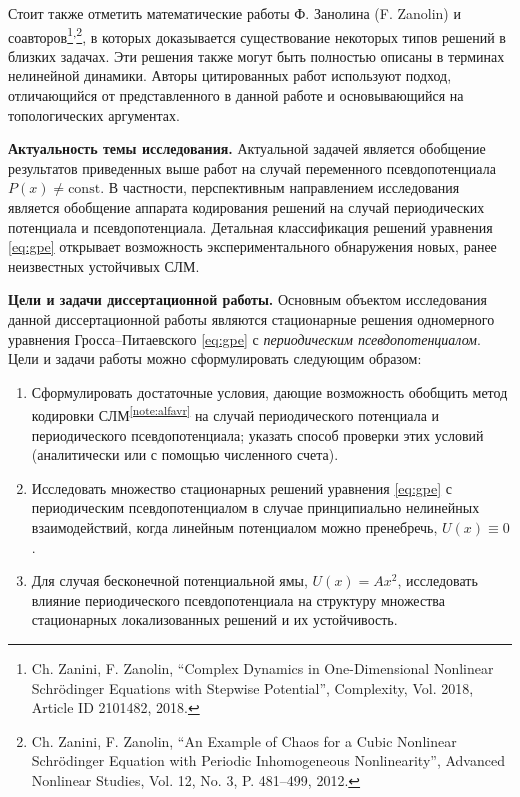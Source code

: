 \documentclass[candidate, href, colorlinks]{disser}
\begin{document}
Стоит также отметить математические работы Ф. Занолина (F. Zanolin) и соавторов\footnote{Ch. Zanini, F. Zanolin, ``Complex Dynamics in One-Dimensional Nonlinear Schr\"odinger Equations with Stepwise Potential'', Complexity, Vol. 2018, Article ID 2101482, 2018.}\textsuperscript{,}\footnote{Ch. Zanini, F. Zanolin, ``An Example of Chaos for a Cubic Nonlinear Schr\"odinger Equation with Periodic Inhomogeneous Nonlinearity'', Advanced Nonlinear Studies, Vol. 12, No. 3, P. 481--499, 2012.}, в которых доказывается существование некоторых типов решений в близких задачах.
Эти решения также могут быть полностью описаны в терминах нелинейной динамики.
Авторы цитированных работ используют подход, отличающийся от представленного в данной работе и основывающийся на топологических аргументах.

\textbf{Актуальность темы исследования.}
Актуальной задачей является обобщение результатов приведенных выше работ на случай переменного псевдопотенциала $P(x) \neq \mathrm{const}$.
В частности, перспективным направлением исследования является обобщение аппарата кодирования решений на случай периодических потенциала и псевдопотенциала.
Детальная классификация решений уравнения \eqref{eq:gpe} открывает возможность экспериментального обнаружения новых, ранее неизвестных устойчивых СЛМ.

\textbf{Цели и задачи диссертационной работы.}
Основным объектом исследования данной диссертационной работы являются стационарные решения одномерного уравнения Гросса--Питаевского \eqref{eq:gpe} с {\it периодическим псевдопотенциалом}.
Цели и задачи работы можно сформулировать следующим образом:
\begin{enumerate}
	\item Сформулировать достаточные условия, дающие возможность обобщить метод кодировки СЛМ\textsuperscript{\ref{note:alfavr}} на случай периодического потенциала и периодического псевдопотенциала; указать способ проверки этих условий (аналитически или с помощью численного счета).
	\item Исследовать множество стационарных решений уравнения \eqref{eq:gpe} с периодическим псевдопотенциалом в случае принципиально нелинейных взаимодействий, когда линейным потенциалом можно пренебречь, $U(x) \equiv 0$.
	\item Для случая бесконечной потенциальной ямы, $U(x) = A x^2$, исследовать влияние периодического псевдопотенциала на структуру множества стационарных локализованных решений и их устойчивость.
\end{enumerate}
\end{document}
